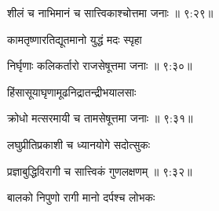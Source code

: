 
{\devanagarifont शीलं च नाभिमानं च सात्त्विकाश्चोत्तमा जनाः {॥ ९:२९॥} \veg\dontdisplaylinenum }%

{\devanagarifont कामतृष्णारतिद्यूतमानो युद्धं मदः स्पृहा \thinspace{\dandab} \dontdisplaylinenum }%


{\devanagarifont निर्घृणाः कलिकर्तारो राजसेषूत्तमा जनाः {॥ ९:३०॥} \veg\dontdisplaylinenum }%

{\devanagarifont हिंसासूयाघृणामूढनिद्रातन्द्रीभयालसाः \thinspace{\dandab} \dontdisplaylinenum }%


{\devanagarifont क्रोधो मत्सरमायी च तामसेषूत्तमा जनाः {॥ ९:३१॥} \veg\dontdisplaylinenum }%

{\devanagarifont लघुप्रीतिप्रकाशी च ध्यानयोगे सदोत्सुकः \thinspace{\dandab} \dontdisplaylinenum }%


{\devanagarifont प्रज्ञाबुद्धिविरागी च सात्त्विकं गुणलक्षणम् {॥ ९:३२॥} \veg\dontdisplaylinenum }%

{\devanagarifont बालको निपुणो रागी मानो दर्पश्च लोभकः \thinspace{\dandab} \dontdisplaylinenum }%

